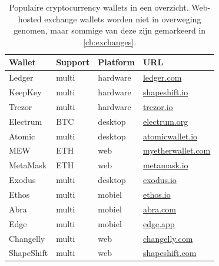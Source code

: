 \begin{table}

\centering

\caption[Een selectie van cryptocurrency wallets]{Populaire cryptocurrency wallets in een overzicht. Web-hosted exchange wallets worden niet in overweging genomen, maar sommige van deze zijn gemarkeerd in \cref{ch:exchanges}.}
\begin{tabular}{llll} 
\toprule

\textbf{Wallet} & \textbf{Support} & \textbf{Platform} & \textbf{URL }\\
\midrule

Ledger          & multi    & hardware   & \href{https://shop.ledger.com/pages/ledger-nano-x?r=1849e3ffabd0}{ledger.com}\\
KeepKey         & multi    & hardware   & \href{http://lddy.no/aczp}{shapeshift.io}\\
Trezor          & multi    & hardware   & \href{https://shop.trezor.io/?offer_id=10&aff_id=3118}{trezor.io}\\
Electrum        & BTC      & desktop    & \href{https://electrum.org/#home}{electrum.org}\\
Atomic          & multi    & desktop    & \href{https://atomicwallet.io/}{atomicwallet.io}\\       
MEW             & ETH      & web        & \href{https://www.myetherwallet.com/}{myetherwallet.com}\\
MetaMask        & ETH      & web        & \href{https://metamask.io/}{metamask.io}\\
Exodus          & multi    & desktop    & \href{https://exodus.io/}{exodus.io}\\
Ethos           & multi    & mobiel     & \href{https://www.ethos.io/universal-wallet/}{ethos.io}\\
Abra            & multi    & mobiel     & \href{https://www.abra.com/}{abra.com}\\
Edge            & multi    & mobiel     & \href{https://edge.app/}{edge.app}\\
Changelly       & multi    & web        & \href{https://changelly.com/}{changelly.com}\\ 
ShapeShift      & multi    & web        & \href{https://shapeshift.com/#top}{shapeshift.com}\\

\bottomrule
\end{tabular}
\label{tab:walletoverview}
\end{table}


